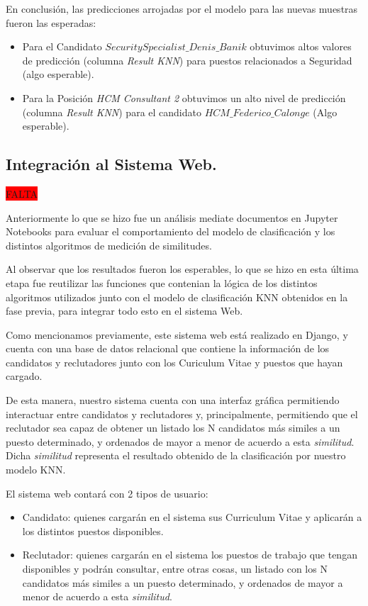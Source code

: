 \documentclass[12pt,a4paper]{article}
\begin{document}
\begin{sloppypar}
En conclusión, las predicciones arrojadas por el modelo para las nuevas muestras fueron las esperadas:
\begin{itemize}
\item Para el Candidato \textit{$SecuritySpecialist\_Denis\_Banik$} obtuvimos altos valores de predicción (columna \textit{Result KNN}) para puestos relacionados a Seguridad (algo esperable).
\item Para la Posición \textit{HCM Consultant 2} obtuvimos un alto nivel de predicción (columna \textit{Result KNN}) para el candidato \textit{$HCM\_Federico\_Calonge$} (Algo esperable).
\end{itemize}

\cleardoublepage

\subsection{Integración al Sistema Web.}\label{5.5.IntegracionalSistemaWeb}
\colorbox{red}{FALTA}

Anteriormente lo que se hizo fue un análisis mediate documentos en Jupyter Notebooks para evaluar el comportamiento del modelo de clasificación y los distintos algoritmos de medición de similitudes. 

Al observar que los resultados fueron los esperables, lo que se hizo en esta última etapa fue reutilizar las funciones que contenian la lógica de los distintos algoritmos utilizados junto con el modelo de clasificación KNN obtenidos en la fase previa, para integrar todo esto en el sistema Web. 

Como mencionamos previamente, este sistema web está realizado en Django, y cuenta con una base de datos relacional que contiene la información de los candidatos y reclutadores junto con los Curiculum Vitae y puestos que hayan cargado. 

De esta manera, nuestro sistema cuenta con una interfaz gráfica permitiendo interactuar entre candidatos y reclutadores y, principalmente, permitiendo que el reclutador sea capaz de obtener un listado los N candidatos más similes a un puesto determinado, y ordenados de mayor a menor de acuerdo a esta \textit{similitud}. Dicha \textit{similitud} representa el resultado obtenido de la clasificación por nuestro modelo KNN.

El sistema web contará con 2 tipos de usuario: 
\begin{itemize}
\item Candidato: quienes cargarán en el sistema sus Curriculum Vitae y aplicarán a los distintos puestos disponibles.
\item Reclutador: quienes cargarán en el sistema los puestos de trabajo que tengan disponibles y podrán consultar, entre otras cosas, un listado con los N candidatos más similes a un puesto determinado, y ordenados de mayor a menor de acuerdo a esta \textit{similitud}.
\end{itemize}


\end{sloppypar}
\end{document}
